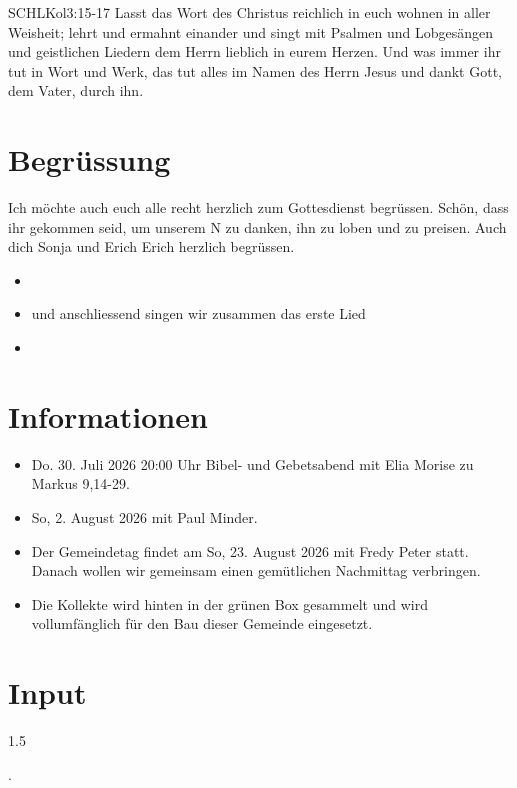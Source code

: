 \documentclass[fontsize=14pt]{mybib}
\author{OTS}
\newcommand{\Name}{Erich}
\begin{document}
\begin{bibelbox}{SCHL}{Kol}{3:15-17}
    Lasst das Wort des Christus reichlich in euch wohnen in aller Weisheit; lehrt und ermahnt einander und singt mit Psalmen und Lobgesängen und geistlichen Liedern dem Herrn lieblich in eurem Herzen. Und was immer ihr tut in Wort und Werk, das tut alles im Namen des Herrn Jesus und dankt Gott, dem Vater, durch ihn.
\end{bibelbox}
\section{Begrüssung}
Ich möchte auch euch alle recht herzlich zum Gottesdienst begrüssen. Schön, dass ihr gekommen seid, um unserem \herr N zu danken, ihn zu loben und zu preisen. 
Auch dich Sonja und Erich \Name{} herzlich begrüssen. 

\begin{itemize}
    \item[] 
    \item[] und anschliessend singen wir zusammen das erste Lied
    \item[] 
\end{itemize}
\section{Informationen}
\begin{itemize}
    \item {} Do. 30. Juli 2026 20:00 Uhr Bibel- und Gebetsabend mit Elia Morise zu Markus 9,14-29.\\
    \item {} So, 2. August 2026 mit Paul Minder.
    \item {} Der Gemeindetag findet am So, 23. August 2026 mit Fredy Peter statt. Danach wollen wir gemeinsam einen gemütlichen Nachmittag verbringen.
    \item {} Die Kollekte wird hinten in der grünen Box gesammelt und wird vollumfänglich für den Bau dieser Gemeinde eingesetzt.
\end{itemize}
\section{Input}
\begin{spacing}{1.5}
      
    .
\end{spacing}
\end{document}
